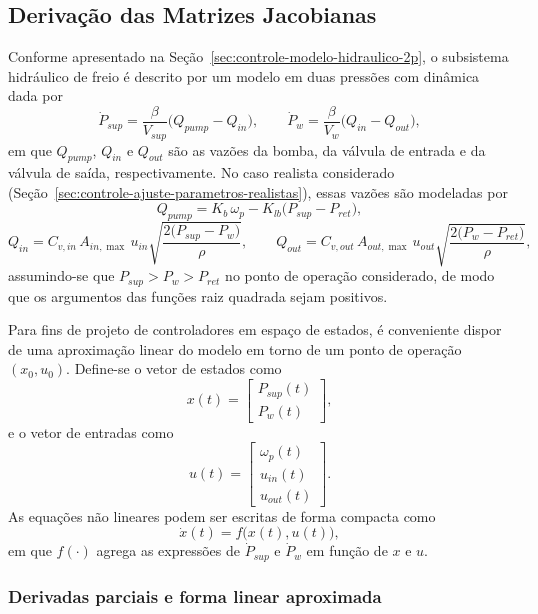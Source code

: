 \subsection{Derivação das Matrizes Jacobianas}
\label{sec:derivacao-matrizes-jacobianas}

Conforme apresentado na Seção~\ref{sec:controle-modelo-hidraulico-2p}, o subsistema hidráulico de freio é descrito por um modelo em duas pressões com dinâmica dada por
\[
    \dot{P}_{sup} = \frac{\beta}{V_{sup}}\big(Q_{pump} - Q_{in}\big), 
    \qquad
    \dot{P}_{w}   = \frac{\beta}{V_{w}}\big(Q_{in} - Q_{out}\big),
\]
em que $Q_{pump}$, $Q_{in}$ e $Q_{out}$ são as vazões da bomba, da válvula de entrada e da válvula de saída, respectivamente. No caso realista considerado (Seção~\ref{sec:controle-ajuste-parametros-realistas}), essas vazões são modeladas por
\[
    Q_{pump} = K_b\,\omega_p - K_{lb}\big(P_{sup} - P_{ret}\big),
\]
\[
    Q_{in} = C_{v,in}\,A_{in,\max}\,u_{in}
             \sqrt{\frac{2\big(P_{sup} - P_{w}\big)}{\rho}},
    \qquad
    Q_{out} = C_{v,out}\,A_{out,\max}\,u_{out}
             \sqrt{\frac{2\big(P_{w} - P_{ret}\big)}{\rho}},
\]
assumindo-se que $P_{sup} > P_{w} > P_{ret}$ no ponto de operação considerado, de modo que os argumentos das funções raiz quadrada sejam positivos.

Para fins de projeto de controladores em espaço de estados, é conveniente dispor de uma aproximação linear do modelo em torno de um ponto de operação $(x_0,u_0)$. Define-se o vetor de estados como
\[
    x(t) = 
    \begin{bmatrix}
        P_{sup}(t) \\
        P_{w}(t)
    \end{bmatrix},
\]
e o vetor de entradas como
\[
    u(t) = 
    \begin{bmatrix}
        \omega_p(t) \\
        u_{in}(t) \\
        u_{out}(t)
    \end{bmatrix}.
\]
As equações não lineares podem ser escritas de forma compacta como
\[
    \dot{x}(t) = f\big(x(t),u(t)\big),
\]
em que $f(\cdot)$ agrega as expressões de $\dot{P}_{sup}$ e $\dot{P}_{w}$ em função de $x$ e $u$.

\subsubsection*{Derivadas parciais e forma linear aproximada}

